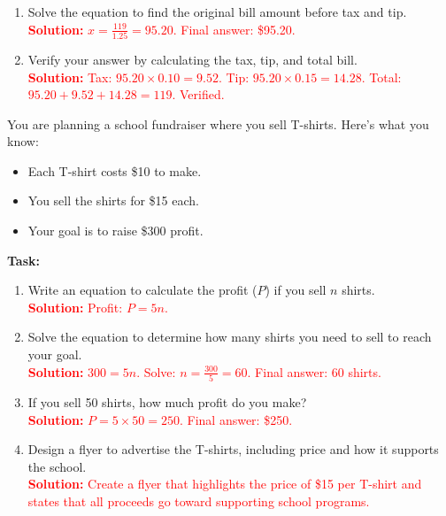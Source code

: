 \documentclass[10pt]{article}
\begin{document}
\begin{tcolorbox}[colframe=black!60, colback=white, 
coltitle=black, colbacktitle=black!15, fonttitle=\bfseries\Large, 
title=Problems, halign title=center, left=10pt, right=10pt, top=10pt, bottom=50pt]
\begin{enumerate}[start=9, itemsep=1em]
\begin{enumerate}[label=(\alph*)]
        \item Solve the equation to find the original bill amount before tax and tip.\\
        \textcolor{red}{\textbf{Solution:} \(x = \frac{119}{1.25} = 95.20\). Final answer: \$95.20.}

        \item Verify your answer by calculating the tax, tip, and total bill.\\
        \textcolor{red}{\textbf{Solution:} Tax: \(95.20 \times 0.10 = 9.52\). Tip: \(95.20 \times 0.15 = 14.28\). Total: \(95.20 + 9.52 + 14.28 = 119\). Verified.}
    \end{enumerate}
\end{enumerate}
\end{tcolorbox}

\vspace{1em}
\begin{tcolorbox}[colframe=black!60, colback=white, 
coltitle=black, colbacktitle=black!15, fonttitle=\bfseries\Large, 
title=Performance Task: Planning a School Fundraiser, halign title=center, left=10pt, right=10pt, top=10pt, bottom=50pt]
You are planning a school fundraiser where you sell T-shirts. Here’s what you know:
\begin{itemize}
    \item Each T-shirt costs \$10 to make.
    \item You sell the shirts for \$15 each.
    \item Your goal is to raise \$300 profit.
\end{itemize}
\textbf{Task:}
\begin{enumerate}[itemsep=3em]
    \item Write an equation to calculate the profit (\(P\)) if you sell \(n\) shirts.\\
    \textcolor{red}{\textbf{Solution:} Profit: \(P = 5n\).}

    \item Solve the equation to determine how many shirts you need to sell to reach your goal.\\
    \textcolor{red}{\textbf{Solution:} \(300 = 5n\). Solve: \(n = \frac{300}{5} = 60\). Final answer: 60 shirts.}

    \item If you sell 50 shirts, how much profit do you make?\\
    \textcolor{red}{\textbf{Solution:} \(P = 5 \times 50 = 250\). Final answer: \$250.}

    \item Design a flyer to advertise the T-shirts, including price and how it supports the school.\\
    \textcolor{red}{\textbf{Solution:} Create a flyer that highlights the price of \$15 per T-shirt and states that all proceeds go toward supporting school programs.}
\end{enumerate}
\end{tcolorbox}
\end{document}
